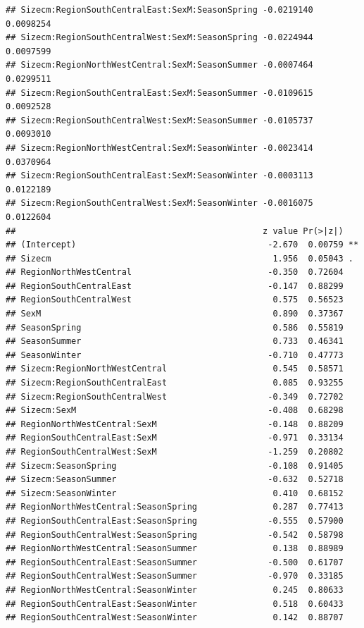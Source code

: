 \documentclass{article}\usepackage[]{graphicx}\usepackage[]{color}
\makeatletter
\newenvironment{kframe}{%
 \def\at@end@of@kframe{}%
 \ifinner\ifhmode%
  \def\at@end@of@kframe{\end{minipage}}%
  \begin{minipage}{\columnwidth}%
 \fi\fi%
 \def\FrameCommand##1{\hskip\@totalleftmargin \hskip-\fboxsep
 \colorbox{shadecolor}{##1}\hskip-\fboxsep
     \hskip-\linewidth \hskip-\@totalleftmargin \hskip\columnwidth}%
 \MakeFramed {\advance\hsize-\width
   \@totalleftmargin\z@ \linewidth\hsize
   \@setminipage}}%
 {\par\unskip\endMakeFramed%
 \at@end@of@kframe}
\newenvironment{knitrout}{}{} %
\makeatother
\begin{document}
\begin{knitrout}
\begin{kframe}
\begin{verbatim}
## Sizecm:RegionSouthCentralEast:SexM:SeasonSpring -0.0219140  0.0098254
## Sizecm:RegionSouthCentralWest:SexM:SeasonSpring -0.0224944  0.0097599
## Sizecm:RegionNorthWestCentral:SexM:SeasonSummer -0.0007464  0.0299511
## Sizecm:RegionSouthCentralEast:SexM:SeasonSummer -0.0109615  0.0092528
## Sizecm:RegionSouthCentralWest:SexM:SeasonSummer -0.0105737  0.0093010
## Sizecm:RegionNorthWestCentral:SexM:SeasonWinter -0.0023414  0.0370964
## Sizecm:RegionSouthCentralEast:SexM:SeasonWinter -0.0003113  0.0122189
## Sizecm:RegionSouthCentralWest:SexM:SeasonWinter -0.0016075  0.0122604
##                                                 z value Pr(>|z|)   
## (Intercept)                                      -2.670  0.00759 **
## Sizecm                                            1.956  0.05043 . 
## RegionNorthWestCentral                           -0.350  0.72604   
## RegionSouthCentralEast                           -0.147  0.88299   
## RegionSouthCentralWest                            0.575  0.56523   
## SexM                                              0.890  0.37367   
## SeasonSpring                                      0.586  0.55819   
## SeasonSummer                                      0.733  0.46341   
## SeasonWinter                                     -0.710  0.47773   
## Sizecm:RegionNorthWestCentral                     0.545  0.58571   
## Sizecm:RegionSouthCentralEast                     0.085  0.93255   
## Sizecm:RegionSouthCentralWest                    -0.349  0.72702   
## Sizecm:SexM                                      -0.408  0.68298   
## RegionNorthWestCentral:SexM                      -0.148  0.88209   
## RegionSouthCentralEast:SexM                      -0.971  0.33134   
## RegionSouthCentralWest:SexM                      -1.259  0.20802   
## Sizecm:SeasonSpring                              -0.108  0.91405   
## Sizecm:SeasonSummer                              -0.632  0.52718   
## Sizecm:SeasonWinter                               0.410  0.68152   
## RegionNorthWestCentral:SeasonSpring               0.287  0.77413   
## RegionSouthCentralEast:SeasonSpring              -0.555  0.57900   
## RegionSouthCentralWest:SeasonSpring              -0.542  0.58798   
## RegionNorthWestCentral:SeasonSummer               0.138  0.88989   
## RegionSouthCentralEast:SeasonSummer              -0.500  0.61707   
## RegionSouthCentralWest:SeasonSummer              -0.970  0.33185   
## RegionNorthWestCentral:SeasonWinter               0.245  0.80633   
## RegionSouthCentralEast:SeasonWinter               0.518  0.60433   
## RegionSouthCentralWest:SeasonWinter               0.142  0.88707   

\end{verbatim}
\end{kframe}
\end{knitrout}
\end{document}
